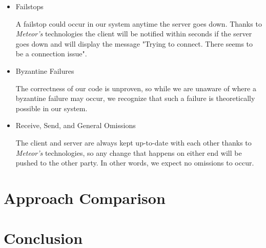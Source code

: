 \documentclass[11pt]{article} %
\begin{document}
\begin{itemize}
	\item Failstops
	
	A failstop could occur in our system anytime the server goes down. Thanks to \textit{Meteor's} technologies the client will be notified within seconds if the server goes down and will display the message "Trying to connect. There seems to be a connection issue".
	
	\item Byzantine Failures
	
	The correctness of our code is unproven, so while we are unaware of where a byzantine failure may occur, we recognize that such a failure is theoretically possible in our system.
	
	\item Receive, Send, and General Omissions
	
	The client and server are always kept up-to-date with each other thanks to \textit{Meteor's} technologies, so any change that happens on either end will be pushed to the other party. In other words, we expect no omissions to occur. 
\end{itemize}	


\section{Approach Comparison} 

\section{Conclusion} 
\end{document}
